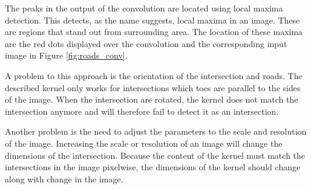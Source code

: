 The peaks in the output of the convolution are located using local maxima
detection. This detects, as the name suggests, local maxima in an image. These
are regions that stand out from surrounding area. The location of these maxima
are the red dots displayed over the convolution and the corresponding input
image in Figure \ref{fig:roads_conv}.

A problem to this approach is the orientation of the intersection and roads.
The described kernel only works for intersections which toes are parallel to
the sides of the image. When the intersection are rotated, the kernel does not
match the intersection anymore and will therefore fail to detect it as an
intersection.

Another problem is the need to adjust the parameters to the scale and
resolution of the image. Increasing the scale or resolution of an image will
change the dimensions of the intersection. Because the content of the kernel
must match the intersections in the image pixelwise, the dimensions of the
kernel should change along with change in the image.






